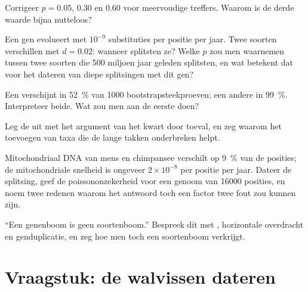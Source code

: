 \begin{exercise}[$\star\star$]\label{exo:b2:phylogenetic-trees:7}
Corrigeer $p = 0.05$, $0.30$ en $0.60$ voor meervoudige treffers. Waarom is de
derde waarde bijna nutteloos?
\end{exercise}

\begin{exercise}[$\star\star$]\label{exo:b2:phylogenetic-trees:8}
Een gen evolueert met $10^{-9}$ substituties per positie per jaar. Twee
soorten verschillen met $d = 0.02$: wanneer splitsten ze? Welke $p$ zou
men waarnemen tussen twee soorten die 500 miljoen jaar geleden splitsten,
en wat betekent dat voor het dateren van diepe splitsingen met dit gen?
\end{exercise}

\begin{exercise}[$\star\star$]\label{exo:b2:phylogenetic-trees:9}
Een  verschijnt in \qty{52}{\%} van \num{1000} bootstrapsteekproeven;
een andere in \qty{99}{\%}. Interpreteer beide. Wat zou men aan de
eerste doen?
\end{exercise}

\begin{exercise}[$\star\star\star$]\label{exo:b2:phylogenetic-trees:10}
Leg de  uit met het argument van het kwart door
toeval, en zeg waarom het toevoegen van taxa die de lange takken onderbreken helpt.
\end{exercise}

\begin{exercise}[$\star\star\star$]\label{exo:b2:phylogenetic-trees:11}
Mitochondriaal DNA van mens en chimpansee verschilt op \qty{9}{\%} van de
posities; de mitochondriale snelheid is ongeveer $2\times 10^{-8}$ per positie
per jaar. Dateer de splitsing, geef de poissononzekerheid voor een
genoom van \qty{16000}{} posities, en noem twee redenen waarom het antwoord
toch een factor twee fout zou kunnen zijn.
\end{exercise}

\begin{exercise}[$\star\star\star$]\label{exo:b2:phylogenetic-trees:12}
``Een genenboom is geen soortenboom.'' Bespreek dit met , horizontale overdracht en genduplicatie, en zeg
hoe men toch een soortenboom verkrijgt.
\end{exercise}

\section{Vraagstuk: de walvissen dateren}

